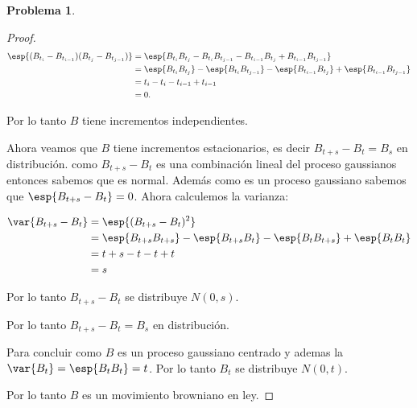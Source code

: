\documentclass[a5paper,oneside]{amsart}
\theoremstyle{plain}
\theoremstyle{definition}
\newtheorem{problema}{Problema}
\begin{document}
\begin{problema}
\begin{proof}
\begin{align}
\esp{(B_{t_i}-B_{t_{i-1}})(B_{t_j}-B_{t_{j-1}})}&=\esp{B_{t_{i}}B_{t_{j}}-B_{t_{i}}B_{t_{j-1}}-B_{t_{i-1}}B_{t_{j}}+B_{t_{i-1}}B_{t_{j-1}}}\notag \\
&=\esp{B_{t_{i}}B_{t_{j}}}-\esp{B_{t_{i}}B_{t_{j-1}}}-\esp{B_{t_{i-1}}B_{t_{j}}}+\esp{B_{t_{i-1}}B_{t_{j-1}}}\notag \\
&=t_i-t_i-t_{i-1}+t_{i-1}\notag \\
&=0.\notag
\end{align}

Por lo tanto $B$ tiene incrementos independientes.

Ahora veamos que $B$ tiene incrementos estacionarios, es decir $B_{t+s}-B_t=B_s$ en distribuci\'on. como $B_{t+s}-B_t$ es una combinaci\'on lineal del proceso gaussianos entonces sabemos que es normal. Adem\'as como es un proceso gaussiano sabemos que $\esp{B_{t+s}-B_t}=0$. Ahora calculemos la varianza:

\begin{align}
\var{B_{t+s}-B_t}&=\esp{(B_{t+s}-B_t)^2}\notag \\
&=\esp{B_{t+s}B_{t+s}}-\esp{B_{t+s}B_{t}}-\esp{B_{t}B_{t+s}}+\esp{B_{t}B_{t}}\notag \\
&=t+s-t-t+t\notag \\
&=s\notag
\end{align}

Por lo tanto $B_{t+s}-B_t$ se distribuye $N(0,s)$.

Por lo tanto $B_{t+s}-B_t=B_s$ en distribuci\'on.

Para concluir como $B$ es un proceso gaussiano centrado y ademas la $\var{B_t}=\esp{B_tB_t}=t$.
Por lo tanto $B_t$ se distribuye $N(0,t)$.

Por lo tanto $B$ es un movimiento browniano en ley.
\end{proof}
\end{problema}
\end{document}
